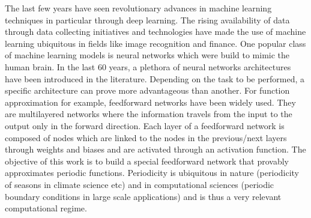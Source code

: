 \documentclass[11pt]{article}
\begin{document}
The last few years have seen revolutionary advances in machine learning techniques in particular through deep learning. The rising availability of data through data collecting initiatives and technologies have made the use of machine learning ubiquitous in fields like image recognition and finance. One popular class of machine learning models is neural networks which were build to mimic the human brain. In the last 60 years, a plethora of neural networks architectures have been introduced in the literature. Depending on the task to be performed, a specific architecture can prove more advantageous than another. For function approximation for example, feedforward networks have been widely used. They are multilayered networks where the information travels from the input to the output only in the forward direction. Each layer of a feedforward network is composed of nodes which are linked to the nodes in the previous/next layers through weights and biases and are activated through an activation function. The objective of this work is to build a special feedforward network that provably approximates periodic functions. Periodicity is ubiquitous in nature (periodicity of seasons in climate science etc) and in computational sciences (periodic boundary conditions in large scale applications) and is thus a very relevant computational regime.
\end{document}

